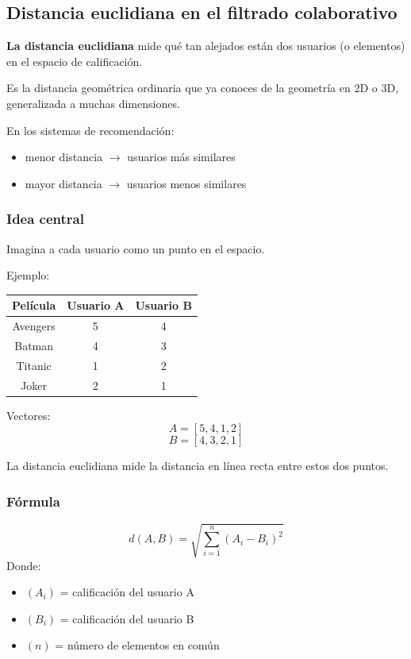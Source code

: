 \documentclass[12pt]{article}
\begin{document}
\subsection{Distancia euclidiana en el filtrado colaborativo}
\textbf{La distancia euclidiana} mide qué tan alejados están dos usuarios (o elementos) en el espacio de calificación.

Es la distancia geométrica ordinaria que ya conoces de la geometría en 2D o 3D, generalizada a muchas dimensiones.

En los sistemas de recomendación:
\begin{itemize}
\item menor distancia $\rightarrow$ usuarios más similares
\item mayor distancia $\rightarrow$ usuarios menos similares
\end{itemize}

\subsubsection*{Idea central}
Imagina a cada usuario como un punto en el espacio.

Ejemplo:
\begin{center}
\begin{tabular}{|c|c|c|}
\hline
Película & Usuario A & Usuario B \\
\hline
Avengers & 5 & 4 \\
Batman & 4 & 3 \\
Titanic & 1 & 2 \\
Joker & 2 & 1 \\
\hline
\end{tabular}
\end{center}

Vectores:
\[
A=[5,4,1,2]
\]
\[
B=[4,3,2,1]
\]

La distancia euclidiana mide la distancia en línea recta entre estos dos puntos.

\subsubsection*{Fórmula}
\[
d(A,B)=\sqrt{\sum_{i=1}^{n}(A_i-B_i)^2}
\]
Donde:
\begin{itemize}
\item $(A_i)$ = calificación del usuario A
\item $(B_i)$ = calificación del usuario B
\item $(n)$ = número de elementos en común
\end{itemize}
\end{document}
